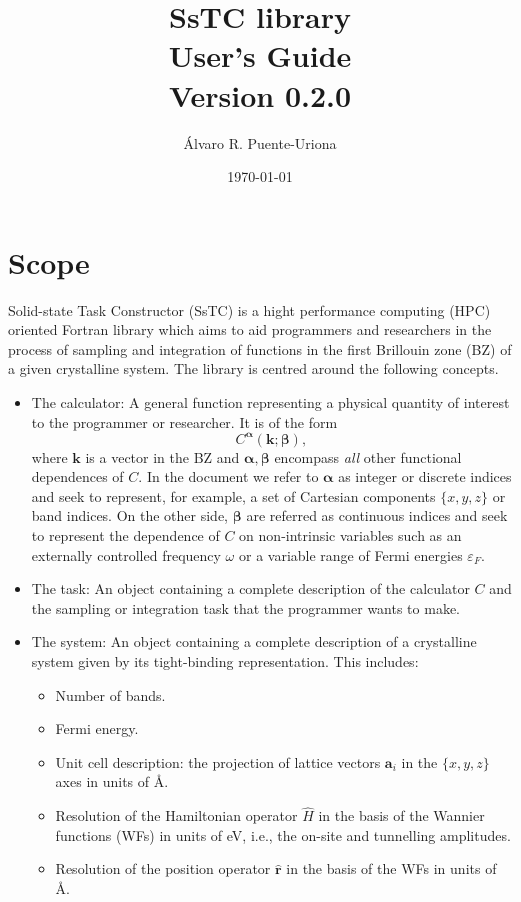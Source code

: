 \documentclass[10pt,a4paper]{article}
\title{SsTC library\\
\large{User's Guide}\\
\large{Version 0.2.0}}
\author{Álvaro R. Puente-Uriona}
\date{\today}
\begin{document}
\maketitle
\tableofcontents
\section{Scope}
Solid-state Task Constructor (SsTC) is a hight performance computing (HPC) oriented Fortran library which aims to aid programmers and researchers in the process of sampling and integration of functions in the first Brillouin zone (BZ) of a given crystalline system. The library is centred around the following concepts.
\begin{itemize}
\item The calculator: A general function representing a physical quantity of interest to the programmer or researcher. It is of the form
\begin{equation}\label{eq:calculator}
C^{\bm{\alpha}}(\bm{k}; \bm{\beta}),
\end{equation}
where $\bm{k}$ is a vector in the BZ and $\bm{\alpha}, \bm{\beta}$ encompass \textit{all} other functional dependences of $C$. In the document we refer to $\bm{\alpha}$ as integer or discrete indices and seek to represent, for example, a set of Cartesian components $\{x, y, z\}$ or band indices. On the other side, $\bm{\beta}$ are referred as continuous indices and seek to represent the dependence of $C$ on non-intrinsic variables such as an externally controlled frequency $\omega$ or a variable range of Fermi energies $\varepsilon_F$.
\item The task: An object containing a complete description of the calculator $C$ and the sampling or integration task that the programmer wants to make.
\item The system: An object containing a complete description of a crystalline system given by its tight-binding \cite{marzariMaximallyLocalizedWannier2012} representation. This includes:
\begin{itemize}
\item Number of bands.
\item Fermi energy.
\item Unit cell description: the projection of lattice vectors $\bm{a}_i$ in the $\{x, y, z\}$ axes in units of \r{A}.
\item Resolution of the Hamiltonian operator $\hat{H}$ in the basis of the Wannier functions (WFs) \cite{marzariMaximallyLocalizedWannier2012} in units of eV, i.e., the on-site and tunnelling amplitudes.
\item Resolution of the position operator $\hat{\bm{r}}$ in the basis of the WFs in units of \r{A}.
\end{itemize}
\end{itemize}
\end{document}

